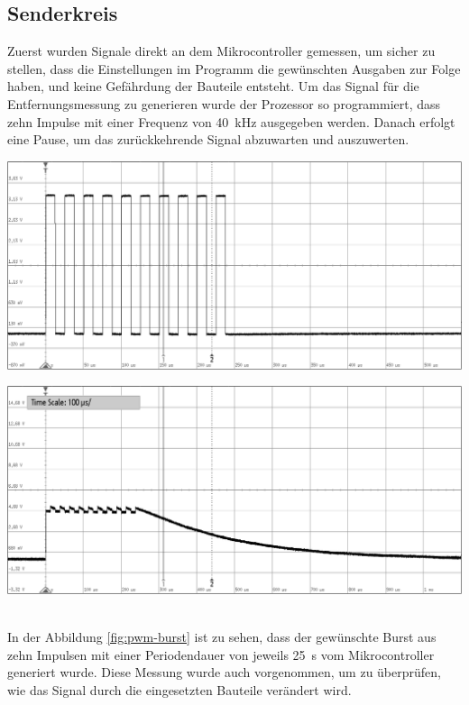 \subsection{Senderkreis}
Zuerst wurden Signale direkt an dem Mikrocontroller gemessen, um sicher zu stellen, dass die Einstellungen im Programm die gewünschten Ausgaben zur Folge haben, und keine Gefährdung der Bauteile entsteht.
Um das Signal für die Entfernungsmessung zu generieren wurde der Prozessor so programmiert, dass zehn Impulse mit einer Frequenz von 40~kHz ausgegeben werden. Danach erfolgt eine Pause, um das zurückkehrende Signal abzuwarten und auszuwerten.\\
\begin{minipage}{0.46\textwidth}
\includegraphics[width=1\textwidth%
]{Abbildungen/MessungenP1/PWM-von-der-cpu.png}
\label{fig:pwm-burst}
\end{minipage}\qquad
\begin{minipage}{0.46\textwidth}
\includegraphics[width=1\textwidth%
]{Abbildungen/MessungenP1/PWM-ausgabe-mit-Hi-Side.png}
\label{fig:HiSide}
\end{minipage}\\
In der Abbildung \ref{fig:pwm-burst} ist zu sehen, dass der gewünschte Burst aus zehn Impulsen mit einer Periodendauer von jeweils 25~\textmu s vom Mikrocontroller generiert wurde. Diese Messung wurde auch vorgenommen, um zu überprüfen, wie das Signal durch die eingesetzten Bauteile verändert wird.\\

